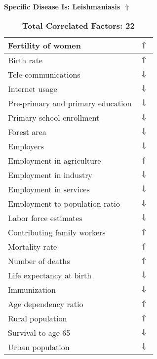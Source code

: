 \documentclass[12pt,notitlepage,oneside]{report}
\begin{document}
\begin{table}[!htb]
\caption{\textbf{Specific Disease Is: Leishmaniasis $\Uparrow$}}
\centering
\label{Correlated Socio-economic Factors0}
\begin{tabular}{|l|l|}
\hline
Fertility of women & $\Uparrow$\\ \hline
Birth rate & $\Uparrow$\\ \hline
Tele-communications & $\Downarrow$\\ \hline
Internet usage & $\Downarrow$\\ \hline
Pre-primary and primary education & $\Downarrow$\\ \hline
Primary school enrollment & $\Downarrow$\\ \hline
Forest area & $\Downarrow$\\ \hline
Employers & $\Downarrow$\\ \hline
Employment in agriculture & $\Uparrow$\\ \hline
Employment in industry & $\Downarrow$\\ \hline
Employment in services & $\Downarrow$\\ \hline
Employment to population ratio & $\Downarrow$\\ \hline
Labor force estimates & $\Downarrow$\\ \hline
Contributing family workers & $\Uparrow$\\ \hline
Mortality rate & $\Uparrow$\\ \hline
Number of deaths & $\Uparrow$\\ \hline
Life expectancy at birth & $\Downarrow$\\ \hline
Immunization & $\Downarrow$\\ \hline
Age dependency ratio & $\Uparrow$\\ \hline
Rural population & $\Uparrow$\\ \hline
Survival to age 65 & $\Downarrow$\\ \hline
Urban population & $\Downarrow$\\ \hline
\end{tabular}
\caption*{\textbf{Total Correlated Factors: 22}}
\end{table}
\end{document}
